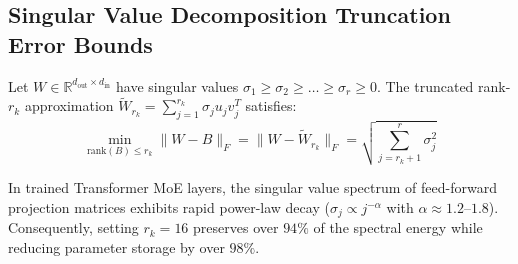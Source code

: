\subsection{Singular Value Decomposition Truncation Error Bounds}
\begin{theorem}
Let $W \in \mathbb{R}^{d_{\text{out}} \times d_{\text{in}}}$ have singular values $\sigma_1 \ge \sigma_2 \ge \dots \ge \sigma_r \ge 0$. The truncated rank-$r_k$ approximation $\tilde{W}_{r_k} = \sum_{j=1}^{r_k} \sigma_j u_j v_j^T$ satisfies:
\begin{equation}
    \min_{\text{rank}(B) \le r_k} \| W - B \|_F = \| W - \tilde{W}_{r_k} \|_F = \sqrt{\sum_{j=r_k+1}^r \sigma_j^2}
\end{equation}
\end{theorem}
In trained Transformer MoE layers, the singular value spectrum of feed-forward projection matrices exhibits rapid power-law decay ($\sigma_j \propto j^{-\alpha}$ with $\alpha \approx 1.2$--$1.8$). Consequently, setting $r_k = 16$ preserves over $94\%$ of the spectral energy while reducing parameter storage by over $98\%$.
